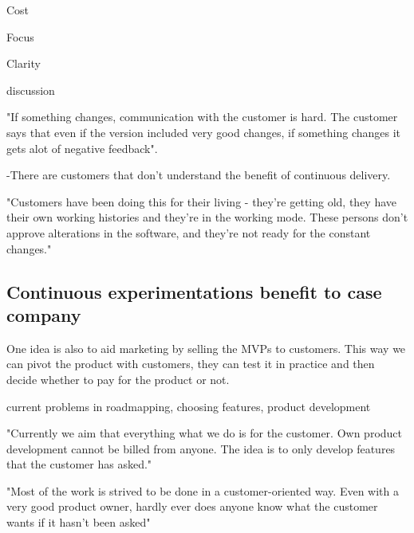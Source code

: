 \documentclass[english]{tktltiki2}
\theoremstyle{definition}
\theoremstyle{remark}
\begin{document}
Cost


Focus 


Clarity


discussion

"If something changes, communication with the customer is hard. The customer says that even if the version included very good changes, if something changes it gets alot of negative feedback".

-There are customers that don't understand the benefit of continuous delivery.

"Customers have been doing this for their living - they're getting old, they have their own working histories and they're in the working mode. These persons don't approve alterations in the software, and they're not ready for the constant changes."

\subsection{Continuous experimentations benefit to case company}

One idea is also to aid marketing by selling the MVPs to customers. This way we can pivot the product with customers, they can test it in practice and then decide whether to pay for the product or not. \newline


current problems in roadmapping, choosing features, product development

"Currently we aim that everything what we do is for the customer. Own product development cannot be billed from anyone. The idea is to only develop features that the customer has asked."

"Most of the work is strived to be done in a customer-oriented way. Even with a very good product owner, hardly ever does anyone know what the customer wants if it hasn't been asked"
\end{document}
